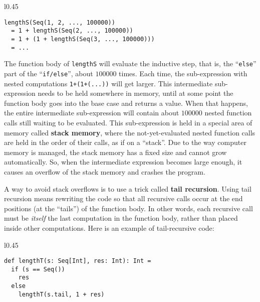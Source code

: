 \begin{wrapfigure}{l}{0.45\columnwidth}%
\vspace{-1\baselineskip}
\begin{lstlisting}
lengthS(Seq(1, 2, ..., 100000))
  = 1 + lengthS(Seq(2, ..., 100000))
  = 1 + (1 + lengthS(Seq(3, ..., 100000)))
  = ...
\end{lstlisting}

\vspace{-1.5\baselineskip}
\end{wrapfigure}%

\noindent The function body of \lstinline!lengthS! will evaluate
the inductive step, that is, the ``\lstinline!else!'' part of the
``\lstinline!if/else!'', about $100000$ times. Each time, the
sub-expression with nested computations \lstinline!1+(1+(...))! will
get larger. This intermediate sub-expression needs to be held somewhere
in memory, until at some point the function body goes into the base
case and returns a value. When that happens, the entire intermediate
sub-expression will contain about $100000$ nested function calls
still waiting to be evaluated. This sub-expression is held in a special
area of memory called \textbf{stack memory},
where the not-yet-evaluated nested function calls are held in the
order of their calls, as if on a ``stack''. Due to the way computer
memory is managed, the stack memory has a fixed size and cannot grow
automatically. So, when the intermediate expression becomes large
enough, it causes an overflow of the stack memory and crashes the
program.

A way to avoid stack overflows is to use a trick called \textbf{tail
recursion}. Using tail recursion means rewriting
the code so that all recursive calls occur at the end positions (at
the ``tails'') of the function body. In other words, each recursive
call must be \emph{itself} the last computation in the function body,
rather than placed inside other computations. Here is an example of
tail-recursive code:

\begin{wrapfigure}{l}{0.45\columnwidth}%
\vspace{-0.85\baselineskip}
\begin{lstlisting}
def lengthT(s: Seq[Int], res: Int): Int =
  if (s == Seq())
    res
  else
    lengthT(s.tail, 1 + res)
\end{lstlisting}

\vspace{-1.5\baselineskip}
\end{wrapfigure}%

